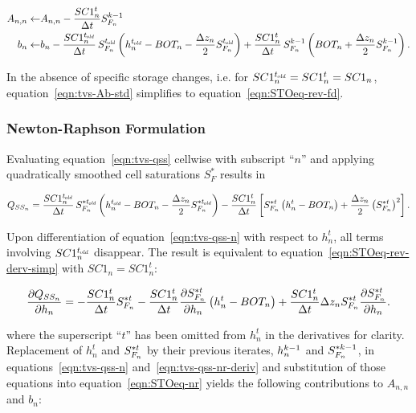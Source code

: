 \begin{equation}
	\label{eqn:tvs-Ab-std}
	\begin{aligned}
		A_{n,n} \leftarrow & A_{n,n} - \frac{SC1_n^t}{\Delta t} S_{F_n}^{k-1} \\
		b_n \leftarrow & b_n - \frac{SC1_n^{t_\mathit{\kern -0.07em old}}}{\Delta t} \, S_{F_n}^{t_\mathit{\kern -0.07em old}} \left( h_n^{t_\mathit{\kern -0.07em old}} - BOT_n - \frac{\Delta z_n}{2} S_{F_n}^{t_\mathit{\kern -0.07em old}} \right) + \frac{SC1_n^t}{\Delta t} \, S_{F_n}^{k-1} \left( BOT_n + \frac{\Delta z_n}{2} S_{F_n}^{k-1} \right) .
	\end{aligned}
\end{equation}

\noindent In the absence of specific storage changes, i.e. for $SC1_n^{t_\mathit{\kern -0.07em old}} = SC1_n^t = SC1_n$, equation~\ref{eqn:tvs-Ab-std} simplifies to equation~\ref{eqn:STOeq-rev-fd}.


\subsubsection{Newton-Raphson Formulation}

Evaluating equation~\ref{eqn:tvs-qss} cellwise with subscript ``$n$'' and applying quadratically smoothed cell saturations $S_F^*$ results in

\begin{equation}
	\label{eqn:tvs-qss-n}
	Q_{SS_n} = \frac{SC1_n^{t_\mathit{\kern -0.07em old}}}{\Delta t} \, S_{F_n}^{\ast t_\mathit{\kern -0.07em old}} \left( h_n^{t_\mathit{\kern -0.07em old}} - BOT_n - \frac{\Delta z_n}{2} S_{F_n}^{\ast t_\mathit{\kern -0.07em old}} \right) - \frac{SC1_n^t}{\Delta t} \left[ S_{F_n}^{\ast t} \left( h_n^t - BOT_n \right) + \frac{\Delta z_n}{2} \left( S_{F_n}^{\ast t} \right)^2 \right] .
\end{equation}

\noindent Upon differentiation of equation~\ref{eqn:tvs-qss-n} with respect to $h_n^t$, all terms involving $SC1_n^{t_\mathit{\kern -0.07em old}}$ disappear. The result is equivalent to equation~\ref{eqn:STOeq-rev-derv-simp} with $SC1_n = SC1_n^t$:

\begin{equation}
	\label{eqn:tvs-qss-nr-deriv}
	\frac{\partial Q_{SS_n}}{\partial h_n} = -\frac{SC1_n^t}{\Delta t} S_{F_n}^{\ast t} - \frac{SC1_n^t}{\Delta t} \frac{\partial S_{F_n}^{\ast t}}{\partial h_n} \left( h_n^t - BOT_n \right) + \frac{SC1_n^t}{\Delta t} \Delta z_n S_{F_n}^{\ast t}  \frac{\partial S_{F_n}^{\ast t}}{\partial h_n} .
\end{equation}

\noindent where the superscript ``$t$'' has been omitted from $h_n^t$ in the derivatives for clarity. Replacement of $h_n^t$ and $S_{F_n}^{\ast t}$ by their previous iterates, $h_n^{k-1}$ and $S_{F_n}^{\ast k-1}$, in equations~\ref{eqn:tvs-qss-n} and~\ref{eqn:tvs-qss-nr-deriv} and substitution of those equations into equation~\ref{eqn:STOeq-nr} yields the following contributions to $A_{n,n}$ and $b_n$:

